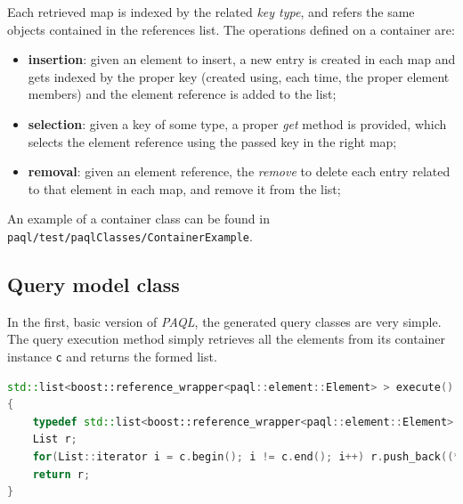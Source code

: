 \documentclass[10pt]{article}  %
\begin{document}
        Each retrieved map is indexed by the related \emph{key type}, and refers the same objects contained
        in the references list.
        The operations defined on a container are:
        \begin{itemize}
            \item \textbf{insertion}: given an element to insert, a new entry is created in each map and gets indexed by
            the proper key (created using, each time, the proper element members) and the element reference is added to the list;
            \item \textbf{selection}: given a key of some type, a proper \emph{get} method is provided,
            which selects the element reference using the passed key in the right map;
            \item \textbf{removal}: given an element reference, the \emph{remove} to delete each entry
            related to that element in each map, and remove it from the list;
        \end{itemize}
        An example of a container class can be found in \texttt{paql/test/paqlClasses/ContainerExample}.
    \subsection{Query model class}
        In the first, basic version of \emph{PAQL}, the generated query classes are very simple. The query execution
        method simply retrieves all the elements from its container instance \texttt{c} and returns the formed list.
        \begin{lstlisting}[language=C++]
std::list<boost::reference_wrapper<paql::element::Element> > execute()
{
    typedef std::list<boost::reference_wrapper<paql::element::Element> > List;
    List r;
    for(List::iterator i = c.begin(); i != c.end(); i++) r.push_back((*i));
    return r;
}
        \end{lstlisting}
\end{document}
